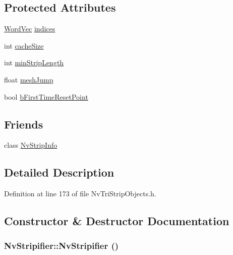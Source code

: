 \subsection*{Protected Attributes}
\begin{CompactItemize}
\item 
\hyperlink{_nv_tri_strip_objects_8h_0e4014090627df01c862364a6acc4020}{WordVec} \hyperlink{class_nv_stripifier_7ddcd00526720153c7518a52ff4e9160}{indices}
\item 
int \hyperlink{class_nv_stripifier_97244655b590f82820a806bedb5ebed2}{cacheSize}
\item 
int \hyperlink{class_nv_stripifier_cab909cd26c771fb14662a3929387c39}{minStripLength}
\item 
float \hyperlink{class_nv_stripifier_308a796c34a6951b149820477318260e}{meshJump}
\item 
bool \hyperlink{class_nv_stripifier_3f2fe6f8f5de4f3e25077d7e486627af}{bFirstTimeResetPoint}
\end{CompactItemize}
\subsection*{Friends}
\begin{CompactItemize}
\item 
class \hyperlink{class_nv_stripifier_d22e3e239c25e2052beb1021c7e54c96}{NvStripInfo}
\end{CompactItemize}


\subsection{Detailed Description}


Definition at line 173 of file NvTriStripObjects.h.

\subsection{Constructor \& Destructor Documentation}
\hypertarget{class_nv_stripifier_f7658997932c8c1affe3b0c133cc196b}{
\subsubsection[{NvStripifier}]{\setlength{\rightskip}{0pt plus 5cm}NvStripifier::NvStripifier ()}}
\label{class_nv_stripifier_f7658997932c8c1affe3b0c133cc196b}




